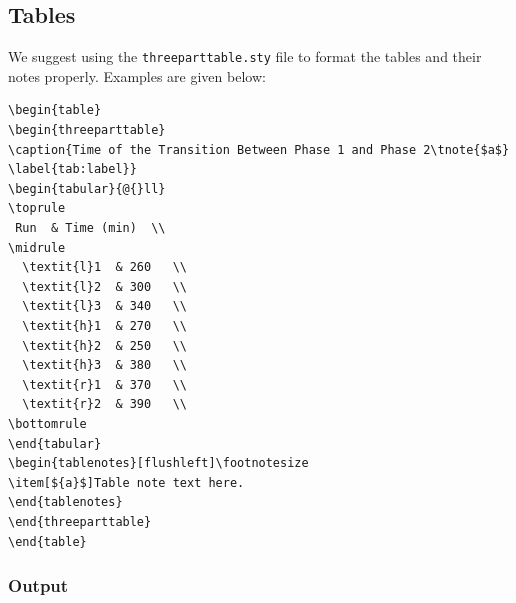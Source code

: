\documentclass[]{imag-ms-template}
\theoremstyle{plain}
\theoremstyle{remark}
\begin{document}
\subsection{Tables}\label{tables}

We suggest using the \verb!threeparttable.sty! file to format the tables
and their notes properly. Examples are given below:

\begin{verbatim}
\begin{table}
\begin{threeparttable}
\caption{Time of the Transition Between Phase 1 and Phase 2\tnote{$a$}
\label{tab:label}}
\begin{tabular}{@{}ll}
\toprule
 Run  & Time (min)  \\
\midrule
  \textit{l}1  & 260   \\
  \textit{l}2  & 300   \\
  \textit{l}3  & 340   \\
  \textit{h}1  & 270   \\
  \textit{h}2  & 250   \\
  \textit{h}3  & 380   \\
  \textit{r}1  & 370   \\
  \textit{r}2  & 390   \\
\bottomrule
\end{tabular}
\begin{tablenotes}[flushleft]\footnotesize
\item[${a}$]Table note text here.
\end{tablenotes}
\end{threeparttable}
\end{table}
\end{verbatim}

\subsubsection*{Output}\label{output}
\end{document}
